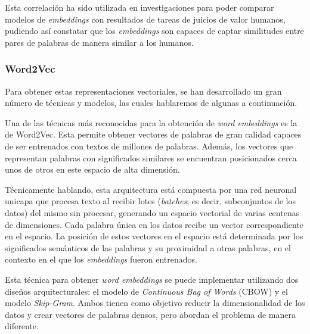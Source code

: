 Esta correlación ha sido utilizada en investigaciones para poder comparar modelos de \textit{embeddings} con resultados de tareas de juicios de valor humanos, pudiendo así constatar que los \textit{embeddings} son capaces de captar similitudes entre pares de palabras de manera similar a los humanos. \parencite{chandrasekaran2021comparativeanalysiswordembeddings}

\subsubsection{Word2Vec}

Para obtener estas representaciones vectoriales, se han desarrollado un gran número de técnicas y modelos, las cuales hablaremos de algunas a continuación.

Una de las técnicas más reconocidas para la obtención de \textit{word embeddings} es la de Word2Vec. \parencite{mikolov2013efficientestimationwordrepresentations} Esta permite obtener vectores de palabras de gran calidad capaces de ser entrenados con textos de millones de palabras. Además, los vectores que representan palabras con significados similares se encuentran posicionados cerca unos de otros en este espacio de alta dimensión.

Técnicamente hablando, esta arquitectura está compuesta por una red neuronal unicapa que procesa texto al recibir lotes (\textit{batches}; es decir, subconjuntos de los datos) del mismo sin procesar, generando un espacio vectorial de varias centenas de dimensiones. Cada palabra única en los datos recibe un vector correspondiente en el espacio. La posición de estos vectores en el espacio está determinada por los significados semánticos de las palabras y su proximidad a otras palabras, en el contexto en el que los \textit{embeddings} fueron entrenados.

Esta técnica para obtener \textit{word embeddings} se puede implementar utilizando dos diseños arquitecturales: el modelo de \textit{Continuous Bag of Words} (CBOW) y el modelo \textit{Skip-Gram}. Ambos tienen como objetivo reducir la dimensionalidad de los datos y crear vectores de palabras densos, pero abordan el problema de manera diferente.


